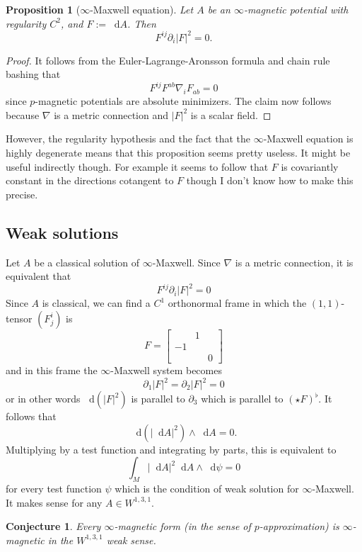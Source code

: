 \documentclass[reqno,11pt]{amsart}
\newcommand*\dif{\mathop{}\!\mathrm{d}}
\newtheorem{proposition}[theorem]{Proposition}
\newtheorem{conjecture}[theorem]{Conjecture}
\theoremstyle{definition}
\numberwithin{equation}{section}
\begin{document}
\begin{proposition}[$\infty$-Maxwell equation]
Let $A$ be an $\infty$-magnetic potential with regularity $C^2$, and $F := \dif A$. Then 
$$F^{ij} \partial_i |F|^2 = 0.$$
\end{proposition}
\begin{proof}
It follows from the Euler-Lagrange-Aronsson formula \cite[Theorem 5.2]{Barron2001} and chain rule bashing that
$$F^{ij} F^{ab} \nabla_i F_{ab} = 0$$
since $p$-magnetic potentials are absolute minimizers.
The claim now follows because $\nabla$ is a metric connection and $|F|^2$ is a scalar field.
\end{proof}

However, the regularity hypothesis and the fact that the $\infty$-Maxwell equation is highly degenerate means that this proposition seems pretty useless.
It might be useful indirectly though.
For example it seems to follow that $F$ is covariantly constant in the directions cotangent to $F$ though I don't know how to make this precise.

\subsection{Weak solutions}
Let $A$ be a classical solution of $\infty$-Maxwell. Since $\nabla$ is a metric connection, it is equivalent that 
$$F^{ij} \partial_i |F|^2 = 0$$
Since $A$ is classical, we can find a $C^1$ orthonormal frame in which the $(1, 1)$-tensor $(F^i_j)$ is
$$F = \begin{bmatrix}& 1 \\ -1 \\ && 0\end{bmatrix}$$
and in this frame the $\infty$-Maxwell system becomes 
$$\partial_1 |F|^2 = \partial_2 |F|^2 = 0$$
or in other words $\dif(|F|^2)$ is parallel to $\partial_3$ which is parallel to $(\star F)^\flat$.
It follows that
$$\dif(|\dif A|^2) \wedge \dif A = 0.$$
Multiplying by a test function and integrating by parts, this is equivalent to 
$$\int_M |\dif A|^2 \dif A \wedge \dif \psi = 0$$
for every test function $\psi$ which is the condition of weak solution for $\infty$-Maxwell.
It makes sense for any $A \in W^{1, 3, 1}$.

\begin{conjecture}
Every $\infty$-magnetic form (in the sense of $p$-approximation) is $\infty$-magnetic in the $W^{1, 3, 1}$ weak sense.
\end{conjecture}
\end{document}
